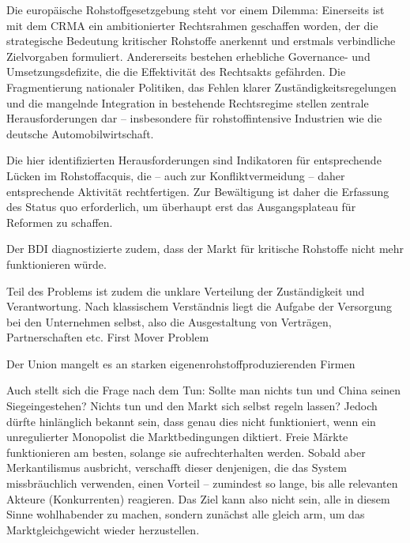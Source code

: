 \documentclass[12pt,a4paper,oneside]{book} %
\begin{document}
Die europäische Rohstoffgesetzgebung steht vor einem Dilemma: Einerseits ist mit dem CRMA ein ambitionierter Rechtsrahmen geschaffen worden, der die strategische Bedeutung kritischer Rohstoffe anerkennt und erstmals verbindliche Zielvorgaben formuliert. Andererseits bestehen erhebliche Governance- und Umsetzungsdefizite, die die Effektivität des Rechtsakts gefährden. Die Fragmentierung nationaler Politiken, das Fehlen klarer Zuständigkeitsregelungen und die mangelnde Integration in bestehende Rechtsregime stellen zentrale Herausforderungen dar -- insbesondere für rohstoffintensive Industrien wie die deutsche Automobilwirtschaft.

Die hier identifizierten Herausforderungen sind Indikatoren für entsprechende Lücken im Rohstoffacquis, die -- auch zur Konfliktvermeidung -- daher entsprechende Aktivität rechtfertigen. Zur Bewältigung ist daher die Erfassung des Status quo erforderlich, um überhaupt erst das Ausgangsplateau für Reformen zu schaffen.

Der BDI diagnostizierte zudem, dass der Markt für kritische Rohstoffe nicht mehr funktionieren würde.

Teil des Problems ist zudem die unklare Verteilung der Zuständigkeit und Verantwortung. Nach klassischem Verständnis liegt die Aufgabe der Versorgung bei den Unternehmen selbst, also die Ausgestaltung von Verträgen, Partnerschaften etc. 
First Mover Problem

Der Union mangelt es an starken \glqq eigenen\grqq rohstoffproduzierenden Firmen

Auch stellt sich die Frage nach dem Tun: Sollte man nichts tun und China seinen \glqq Sieg\grqq eingestehen? Nichts tun und den Markt sich selbst regeln lassen? Jedoch dürfte hinlänglich bekannt sein, dass genau dies nicht funktioniert, wenn ein unregulierter Monopolist die Marktbedingungen diktiert. Freie Märkte funktionieren am besten, solange sie aufrechterhalten werden. Sobald aber Merkantilismus ausbricht, verschafft dieser denjenigen, die das System missbräuchlich verwenden, einen Vorteil -- zumindest so lange, bis alle relevanten Akteure (Konkurrenten) reagieren. Das Ziel kann also nicht sein, alle in diesem Sinne wohlhabender zu machen, sondern zunächst alle \glqq gleich arm\grqq, um das Marktgleichgewicht wieder herzustellen.
	
\end{document}
